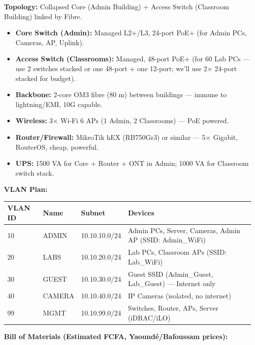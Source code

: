 \documentclass[11pt]{article}
\begin{document}
\begin{exoresolu}
\textbf{Topology:} Collapsed Core (Admin Building) + Access Switch (Classroom Building) linked by Fibre.
\begin{itemize}
\item \textbf{Core Switch (Admin):} Managed L2+/L3, 24-port PoE+ (for Admin PCs, Cameras, AP, Uplink).
\item \textbf{Access Switch (Classrooms):} Managed, 48-port PoE+ (for 60 Lab PCs — use 2 switches stacked or one 48-port + one 12-port; we'll use 2× 24-port stacked for budget).
\item \textbf{Backbone:} 2-core OM3 fibre (80 m) between buildings — immune to lightning/EMI, 10G capable.
\item \textbf{Wireless:} 3× Wi-Fi 6 APs (1 Admin, 2 Classrooms) — PoE powered.
\item \textbf{Router/Firewall:} MikroTik hEX (RB750Gr3) or similar — 5× Gigabit, RouterOS, cheap, powerful.
\item \textbf{UPS:} 1500 VA for Core + Router + ONT in Admin; 1000 VA for Classroom switch stack.
\end{itemize}

\textbf{VLAN Plan:}

\begin{center}
\begin{tabular}{|l|l|l|l|}\hline
\rowcolor{popblueL}
\textbf{VLAN ID} & \textbf{Name} & \textbf{Subnet} & \textbf{Devices} \\ \hline
10 & ADMIN & 10.10.10.0/24 & Admin PCs, Server, Cameras, Admin AP (SSID: Admin\_WiFi) \\ \hline
20 & LABS & 10.10.20.0/24 & Lab PCs, Classroom APs (SSID: Lab\_WiFi) \\ \hline
30 & GUEST & 10.10.30.0/24 & Guest SSID (Admin\_Guest, Lab\_Guest) — Internet only \\ \hline
40 & CAMERA & 10.10.40.0/24 & IP Cameras (isolated, no internet) \\ \hline
99 & MGMT & 10.10.99.0/24 & Switches, Router, APs, Server (iDRAC/iLO) \\ \hline
\end{tabular}
\end{center}

\textbf{Bill of Materials (Estimated FCFA, Yaoundé/Bafoussam prices):}


\end{exoresolu}
\end{document}

